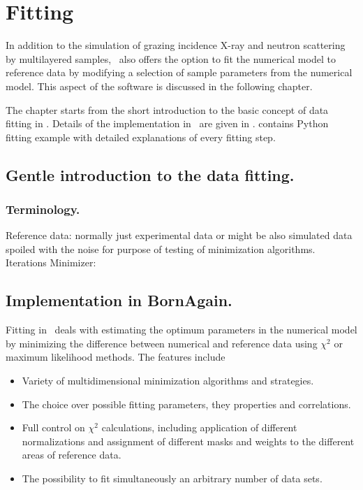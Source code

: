 \newpage
\chapter{Fitting} 

In addition to the simulation of grazing incidence
X-ray and neutron scattering by
multilayered samples, \BornAgain\ also offers the option to
fit the numerical model to reference data by modifying a selection of
sample parameters from the numerical model.  This aspect
of the software is discussed in the following chapter.

The chapter starts from the short introduction to the basic concept of data fitting
in . Details of the implementation in \BornAgain\ are given
in .
 contains Python fitting example with detailed explanations of every fitting step.


\section{Gentle introduction to the data fitting.} 

\subsection{Terminology.}
Reference data: normally just experimental data or might be also simulated data
spoiled with the noise for purpose of testing of minimization algorithms.
Iterations
Minimizer:


\section{Implementation in BornAgain.} 

Fitting in  \BornAgain\ deals with estimating the optimum parameters
in the numerical model by minimizing the difference between
numerical and reference data using $\chi^2$  or maximum likelihood methods. The features include 

\begin{itemize}
\item Variety of multidimensional minimization algorithms and strategies.
\item The choice over possible fitting parameters, they properties and correlations.
\item Full control on $\chi^2$ calculations, including application of different normalizations and assignment of different masks and weights to the different areas of reference data.
\item The possibility to fit simultaneously an arbitrary number of data sets.
\end{itemize}

